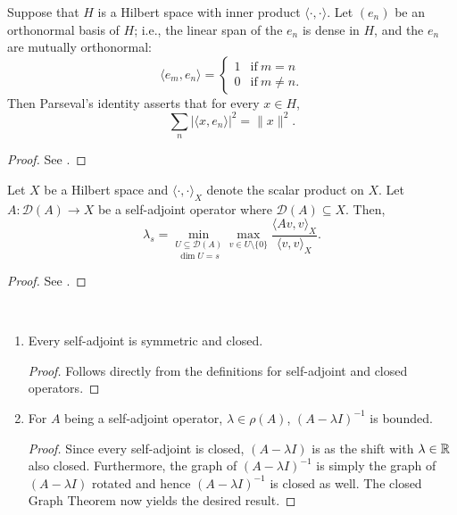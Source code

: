 \begin{atheorem}
	Suppose that $H$ is a Hilbert space with inner product $\langle \cdot,\cdot \rangle$. Let $(e_{n})$ be an orthonormal basis of $H$; i.e., the linear span of the $e_n$ is dense in $H$, and the $e_n$ are mutually orthonormal:
		\[ \langle e_{m},e_{n}\rangle ={\begin{cases}1&{\mbox{if}}\ m=n\\0&{\mbox{if}}\ m\not =n.\end{cases}} \]
	Then Parseval's identity asserts that for every $x \in H$,
		\[ \sum _{n}|\langle x,e_{n}\rangle |^{2}=\|x\|^{2}.\]

	\begin{proof}
		See \cite[p. 236]{werner2006funkana}.
	\end{proof}
\end{atheorem}

\begin{atheorem}
	Let $X$ be a Hilbert space and $\langle \cdot, \cdot \rangle_{X}$ denote the scalar product on $X$. Let $A \colon \mathcal{D}(A) \rightarrow X$ be a self-adjoint operator where $\mathcal{D}(A) \subseteq X$. Then,
	\begin{equation}
			\lambda_{s} = \underset{\dim U = s}{\min_{U \subseteq \mathcal{D}(A)}} \max_{v \in U \setminus \{ 0 \} } \frac{\langle A v, v \rangle_{X}}{\langle v, v \rangle_{X}}.  \label{poincare} 
	\end{equation} 

	\begin{proof}
		See \cite[p. 107]{godunov1998modern}. %
	\end{proof}
\end{atheorem}

\begin{atheorem} ~\
	\begin{enumerate}
		\item Every self-adjoint is symmetric and closed.
			\begin{proof}
				 Follows directly from the definitions for self-adjoint and closed operators.
			\end{proof}
		\item For $A$ being a self-adjoint operator, $\lambda \in \rho(A)$, $(A - \lambda I)^{-1}$ is bounded.
			\begin{proof}
				Since every self-adjoint is closed, $(A - \lambda I)$ is as the shift with $\lambda \in \mathbb{R}$ also closed. Furthermore, the graph of $(A - \lambda I)^{-1}$ is simply the graph of $(A - \lambda I)$ rotated and hence $(A - \lambda I)^{-1}$ is closed as well. The closed Graph Theorem now yields the desired result.
			\end{proof}
	\end{enumerate}
\end{atheorem}

